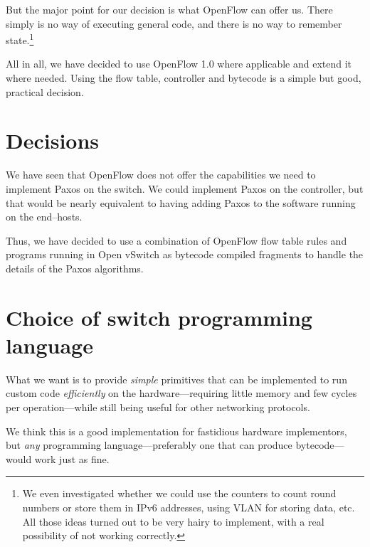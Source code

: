 But the major point for our decision is what OpenFlow can offer us.
There simply is no way of executing general code, and there is no way to
remember state.\footnote{We even investigated whether we could use the
counters to count round numbers or store them in IPv6 addresses, using VLAN
for storing data, etc.  All those ideas turned out to be very hairy to
implement, with a real possibility of not working correctly.}

All in all, we have decided to use OpenFlow 1.0 where applicable and extend
it where needed.  Using the flow table, controller and bytecode is a simple
but good, practical decision.

\section{Decisions}

We have seen that OpenFlow does not offer the capabilities we need to
implement Paxos on the switch.  We could implement Paxos on the controller,
but that would be nearly equivalent to having adding Paxos to the software
running on the end--hosts.

Thus, we have decided to use a combination of OpenFlow flow table rules and
programs running in Open vSwitch as bytecode compiled
fragments to handle the details of the Paxos algorithms.


\section{Choice of switch programming language}


What we want is to provide \textit{simple} primitives that can be
implemented to run custom code \textit{efficiently} on the
hardware---requiring little memory and few cycles per operation---while
still being useful for other networking protocols.

We think this is a good implementation for fastidious hardware implementors,
but \textit{any} programming language---preferably one that can produce
bytecode---would work just as fine.

